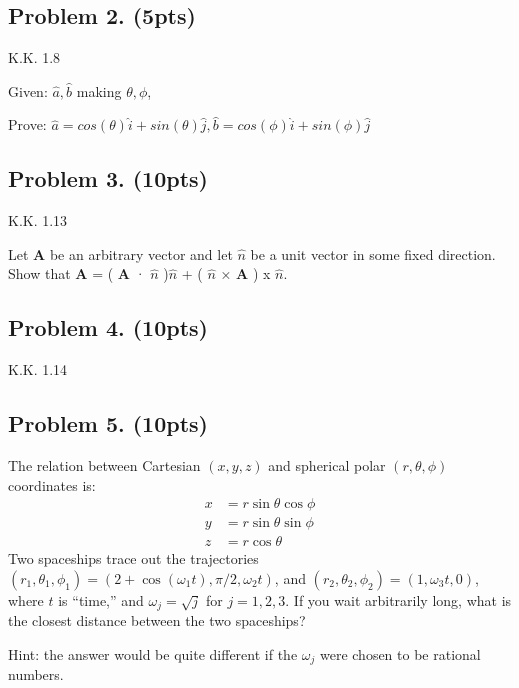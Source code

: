 \documentclass[11pt, notitlepage]{report}
\begin{document}
\subsection{Problem 2. (5pts)}

K.K. 1.8

\vskip 0.1in

Given: $\hat{a}, \hat{b}$ making $\theta, \phi$,

Prove: $\hat{a} = cos(\theta)\hat{i}+sin(\theta)\hat{j}, \hat{b} = cos(\phi)\hat{i}+sin(\phi)\hat{j}$

\vskip 0.3in

\subsection{Problem 3. (10pts)}

K.K. 1.13

Let \textbf{A} be an arbitrary vector and let $\hat{n}$ be a unit vector in some fixed direction. Show that \textbf{A} = ( \textbf{A} · $\hat{n}$ )$\hat{n}$ + ( $\hat{n}$ × \textbf{A} ) x $\hat{n}$.

\vskip 0.1in

\vskip 0.3in

\subsection{Problem 4. (10pts)}
K.K. 1.14

\subsection{Problem 5. (10pts)}

The relation between Cartesian $(x, y, z)$ and spherical polar $(r, \theta, \phi)$ coordinates is:
\begin{align*}
x &= r \sin \theta \cos \phi \\
y &= r \sin \theta \sin \phi \\
z &= r  \cos \theta 
\end{align*}
Two spaceships trace out the trajectories $(r_1, \theta_1, \phi_1) = ( 2 + \cos( \omega_1 t), \pi/2, \omega_2 t)$, and $(r_2, \theta_2, \phi_2) = (1, \omega_3 t, 0)$, where $t$ is ``time,'' and $\omega_j = \sqrt{j}$ for $j = 1, 2, 3$. If you wait arbitrarily long, what is the closest distance between the two spaceships?

Hint: the answer would be quite different if the  $\omega_j$ were chosen to be rational numbers.
\end{document}
